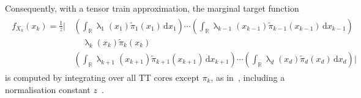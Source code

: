 Consequently, with a tensor train approximation, the marginal target function
\begin{align}
	\begin{split}
		f_{X_k}(x_k) = \frac{1}{z} \Big|\, 
		&\left( \int_{\mathbb{R}} \uplambda_1(x_1) \tilde{\pi}_1(x_1) \, \mathrm{d}x_1 \right) \cdots 
		\left( \int_{\mathbb{R}} \uplambda_{k-1}(x_{k-1}) \tilde{\pi}_{k-1}(x_{k-1}) \, \mathrm{d}x_{k-1} \right) \\
		&\quad \uplambda_k(x_k) \tilde{\pi}_k(x_k) \\
		& \left( \int_{\mathbb{R}} \uplambda_{k+1}(x_{k+1}) \tilde{\pi}_{k+1}(x_{k+1}) \, \mathrm{d}x_{k+1} \right) \cdots 
		\left( \int_{\mathbb{R}} \uplambda_d(x_d) \tilde{\pi}_d(x_d) \, \mathrm{d}x_d \right)
		\Big| 
	\end{split}
\end{align}
is computed by integrating over all TT cores except $\pi_k$, as in~\cite{dolgov2020approximation}, including a normalisation constant $z$~\cite{cui2022deep}.
\\


